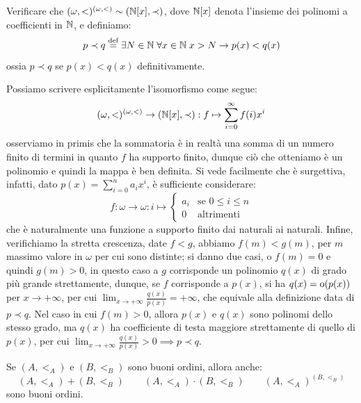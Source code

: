 \begin{exercise}
	Verificare che $(\omega,<)^{(\omega,<)} \sim (\mathbb N[x],\prec)$, dove $\mathbb N[x]$ denota l'insieme dei polinomi a coefficienti in $\mathbb N$, e definiamo:
	\[ p \prec q \overset{\text{def}}{=} \exists N \in \mathbb N \; \forall x \in \mathbb N \; x > N \rightarrow p(x) < q(x)
		\]
	ossia $p \prec q$ se $p(x)<q(x)$ definitivamente.
\end{exercise}

\begin{soln}
	Possiamo scrivere esplicitamente l'isomorfismo come segue:
	\[ (\omega,<)^{(\omega,<)} \to (\mathbb N[x],\prec) : f \mapsto \sum_{i = 0}^{\infty}f(i)x^i
		\]
	osserviamo in primis che la sommatoria è in realtà una somma di un numero finito di termini in quanto $f$ ha supporto finito,
	dunque ciò che otteniamo è un polinomio e quindi la mappa è ben definita. Si vede facilmente che è surgettiva, infatti, dato $p(x) = \sum_{i = 0}^n a_i x^i$, 
	è sufficiente considerare:
	\[ f : \omega \to \omega : i \mapsto \begin{cases}
		a_i &\text{se $0 \leq i \leq n$} \\
		0 &\text{altrimenti}
	\end{cases}
		\] 
	che è naturalmente una funzione a supporto finito dai naturali ai naturali. Infine, verifichiamo la stretta crescenza, date $f < g$, abbiamo $f(m) < g(m)$, 
	per $m$ massimo valore in $\omega$ per cui sono distinte; si danno due casi, o $f(m) = 0$ e quindi $g(m) > 0$, in questo caso a $g$ corrisponde un polinomio $q(x)$ di grado 
	più grande strettamente, dunque, se $f$ corrisponde a $p(x)$, si ha $q(x) = \text o(p(x))$ per $x \to +\infty$, per cui $\lim_{x \to +\infty} \frac{q(x)}{p(x)} = +\infty$, che equivale alla definizione data di $p \prec q$.
	Nel caso in cui $f(m) > 0$, allora $p(x)$ e $q(x)$ sono polinomi dello stesso grado, ma $q(x)$ ha coefficiente di testa maggiore strettamente di quello di $p(x)$,
	per cui $\lim_{x \to +\infty} \frac{q(x)}{p(x)} > 0 \implies p \prec q$.
\end{soln}

\begin{proposition}
	Se $(A,<_A)$ e $(B,<_B)$ sono buoni ordini, allora anche:
	\[ (A,<_A) + (B,<_B) \qquad (A,<_A) \cdot (B,<_B) \qquad (A,<_A)^{(B,<_B)}
		\]
	sono buoni ordini.
\end{proposition}

